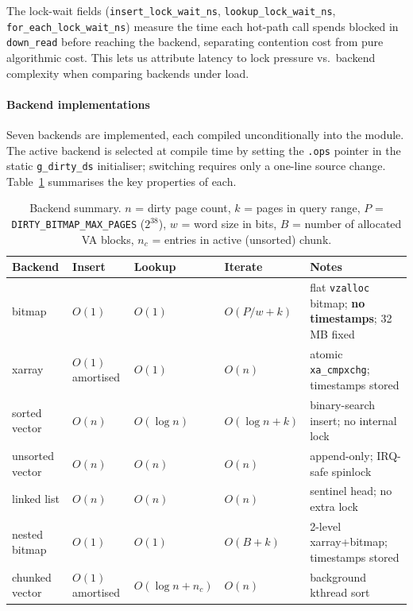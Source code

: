 The lock-wait fields (\texttt{insert\_lock\_wait\_ns},
\texttt{lookup\_lock\_wait\_ns}, \texttt{for\_each\_lock\_wait\_ns}) measure
the time each hot-path call spends blocked in \texttt{down\_read} before
reaching the backend, separating contention cost from pure algorithmic cost.
This lets us attribute latency to lock pressure vs.\ backend complexity when
comparing backends under load.

\paragraph{Backend implementations}

Seven backends are implemented, each compiled unconditionally into the module.
The active backend is selected at compile time by setting the
\texttt{.ops} pointer in the static \texttt{g\_dirty\_ds} initialiser;
switching requires only a one-line source change.
Table~\ref{tab:backends} summarises the key properties of each.

\begin{table}[H]
\centering
\small
\begin{tabular}{lllll}
\hline
\textbf{Backend} & \textbf{Insert} & \textbf{Lookup} & \textbf{Iterate} & \textbf{Notes} \\
\hline
bitmap           & $O(1)$            & $O(1)$          & $O(P/w + k)$     & flat \texttt{vzalloc} bitmap; \textbf{no timestamps}; 32\,MB fixed \\
xarray           & $O(1)$ amortised  & $O(1)$          & $O(n)$           & atomic \texttt{xa\_cmpxchg}; timestamps stored \\
sorted vector    & $O(n)$            & $O(\log n)$     & $O(\log n + k)$  & binary-search insert; no internal lock \\
unsorted vector  & $O(n)$            & $O(n)$          & $O(n)$           & append-only; IRQ-safe spinlock \\
linked list      & $O(n)$            & $O(n)$          & $O(n)$           & sentinel head; no extra lock \\
nested bitmap    & $O(1)$            & $O(1)$          & $O(B + k)$       & 2-level xarray+bitmap; timestamps stored \\
chunked vector   & $O(1)$ amortised  & $O(\log n+n_c)$ & $O(n)$           & background kthread sort \\
\hline
\end{tabular}
\caption{Backend summary. $n$ = dirty page count, $k$ = pages in query range,
         $P$ = \texttt{DIRTY\_BITMAP\_MAX\_PAGES} ($2^{38}$), $w$ = word size in bits,
         $B$ = number of allocated VA blocks, $n_c$ = entries in active (unsorted) chunk.}
\label{tab:backends}
\end{table}


